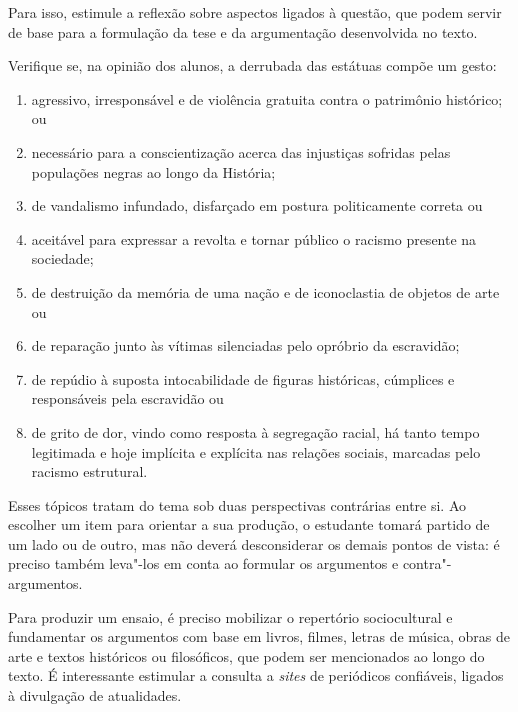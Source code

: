 \documentclass[12pt]{extarticle}
\begin{document}
Para isso, estimule a reflexão sobre aspectos
ligados à questão, que podem servir de base para a formulação da tese
e da argumentação desenvolvida no texto.

Verifique se, na opinião dos alunos, a derrubada das estátuas compõe um
gesto: 

\begin{enumerate}
\item agressivo, irresponsável e de violência gratuita contra o
patrimônio histórico; ou 
\item necessário para a conscientização acerca
das injustiças sofridas pelas populações negras ao longo da História;
\item de vandalismo infundado, disfarçado em postura politicamente correta
ou 
\item aceitável para expressar a revolta e tornar público o racismo
presente na sociedade; 
\item de destruição da memória de uma nação e de
iconoclastia de objetos de arte ou 
\item de reparação junto às vítimas
silenciadas pelo opróbrio da escravidão; 
\item de repúdio à suposta
intocabilidade de figuras históricas, cúmplices e responsáveis pela
escravidão ou 
\item de grito de dor, vindo como resposta à segregação
racial, há tanto tempo legitimada e hoje implícita e explícita nas
relações sociais, marcadas pelo racismo estrutural.
\end{enumerate}



Esses tópicos tratam do tema sob duas perspectivas contrárias entre si.
Ao escolher um item para orientar a sua produção, o estudante tomará
partido de um lado ou de outro, mas não deverá desconsiderar os demais
pontos de vista: é preciso também leva"-los em conta ao formular os
argumentos e contra"-argumentos.

Para produzir um ensaio, é preciso mobilizar o repertório sociocultural
e fundamentar os argumentos com base em livros, filmes, letras de
música, obras de arte e textos históricos ou filosóficos, que podem ser
mencionados ao longo do texto. É interessante estimular a consulta a
\emph{sites} de periódicos confiáveis, ligados à divulgação de
atualidades.
\end{document}
